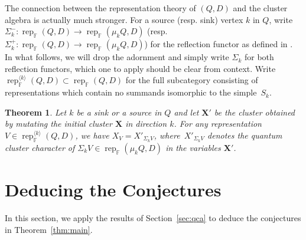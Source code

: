 \documentclass[pdftex]{sigma}
\newcommand{\bfX}{\mathbf{X}}
\newcommand{\FF}{\mathbb{F}}
\newcommand{\rep}{\operatorname{rep}}
\newtheorem{Theorem}{Theorem}
\begin{document}
  The connection between the representation theory of $(Q,D)$ and the cluster algebra is actually much stronger.
  For a source (resp. sink) vertex $k$ in $Q$, write $\Sigma_k^-:\rep_\FF(Q,D)\to\rep_\FF(\mu_kQ,D)$ (resp. $\Sigma_k^+:\rep_\FF(Q,D)\to\rep_\FF(\mu_kQ,D)$) for the reflection functor as defined in \cite[Sec. 2]{dlab-ringel}.  
  In what follows, we will drop the adornment and simply write $\Sigma_k$ for both reflection functors, which one to apply should be clear from context.
  Write $\rep_\FF^{\langle k\rangle}(Q,D)\subset\rep_\FF(Q,D)$ for the full subcategory consisting of representations which contain no summands isomorphic to the simple~$S_k$.
  \begin{Theorem}\cite{rupel1}
    \label{th:reflection functor}
    Let $k$ be a sink or a source in $Q$ and let $\bfX'$ be the cluster obtained by mutating the initial cluster $\bfX$ in direction $k$.
    For any representation $V\in\rep_\FF^{\langle k\rangle}(Q,D)$, we have $X_V=X'_{\Sigma_kV}$, where~$X'_{\Sigma_kV}$ denotes the quantum cluster character of $\Sigma_kV\in\rep_\FF(\mu_kQ,D)$ in the variables $\bfX'$.
  \end{Theorem}

\section{Deducing the Conjectures}
In this section, we apply the results of Section~\ref{sec:qca} to deduce the conjectures in Theorem~\ref{thm:main}.
\end{document}
